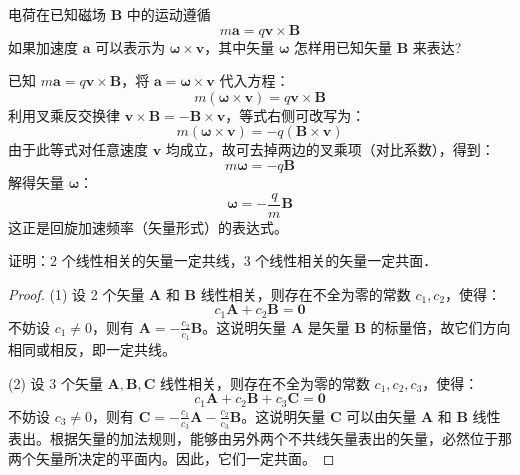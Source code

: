 \begin{exercise}\label{ex:1.19}
电荷在已知磁场 $\boldsymbol{B}$ 中的运动遵循
$$ m\boldsymbol{a} = q\boldsymbol{v} \times \boldsymbol{B} $$
如果加速度 $\boldsymbol{a}$ 可以表示为 $\boldsymbol{\omega} \times \boldsymbol{v}$，其中矢量 $\boldsymbol{\omega}$ 怎样用已知矢量 $\boldsymbol{B}$ 来表达?
\end{exercise}
\begin{solution}
已知 $m\boldsymbol{a} = q\boldsymbol{v} \times \boldsymbol{B}$，将 $\boldsymbol{a} = \boldsymbol{\omega} \times \boldsymbol{v}$ 代入方程：
$$ m(\boldsymbol{\omega} \times \boldsymbol{v}) = q\boldsymbol{v} \times \boldsymbol{B} $$
利用叉乘反交换律 $\boldsymbol{v} \times \boldsymbol{B} = -\boldsymbol{B} \times \boldsymbol{v}$，等式右侧可改写为：
$$ m(\boldsymbol{\omega} \times \boldsymbol{v}) = -q(\boldsymbol{B} \times \boldsymbol{v}) $$
由于此等式对任意速度 $\boldsymbol{v}$ 均成立，故可去掉两边的叉乘项（对比系数），得到：
$$ m\boldsymbol{\omega} = -q\boldsymbol{B} $$
解得矢量 $\boldsymbol{\omega}$：
$$ \boldsymbol{\omega} = -\frac{q}{m}\boldsymbol{B} $$
这正是回旋加速频率（矢量形式）的表达式。
\end{solution}

\begin{exercise}\label{ex:1.20}
证明：2 个线性相关的矢量一定共线，3 个线性相关的矢量一定共面．
\end{exercise}
\begin{proof}
(1) 设 2 个矢量 $\boldsymbol{A}$ 和 $\boldsymbol{B}$ 线性相关，则存在不全为零的常数 $c_1, c_2$，使得：
$$ c_1 \boldsymbol{A} + c_2 \boldsymbol{B} = \boldsymbol{0} $$
不妨设 $c_1 \neq 0$，则有 $\boldsymbol{A} = -\frac{c_2}{c_1} \boldsymbol{B}$。这说明矢量 $\boldsymbol{A}$ 是矢量 $\boldsymbol{B}$ 的标量倍，故它们方向相同或相反，即一定共线。

(2) 设 3 个矢量 $\boldsymbol{A}, \boldsymbol{B}, \boldsymbol{C}$ 线性相关，则存在不全为零的常数 $c_1, c_2, c_3$，使得：
$$ c_1 \boldsymbol{A} + c_2 \boldsymbol{B} + c_3 \boldsymbol{C} = \boldsymbol{0} $$
不妨设 $c_3 \neq 0$，则有 $\boldsymbol{C} = -\frac{c_1}{c_3} \boldsymbol{A} - \frac{c_2}{c_3} \boldsymbol{B}$。这说明矢量 $\boldsymbol{C}$ 可以由矢量 $\boldsymbol{A}$ 和 $\boldsymbol{B}$ 线性表出。根据矢量的加法规则，能够由另外两个不共线矢量表出的矢量，必然位于那两个矢量所决定的平面内。因此，它们一定共面。
\end{proof}

